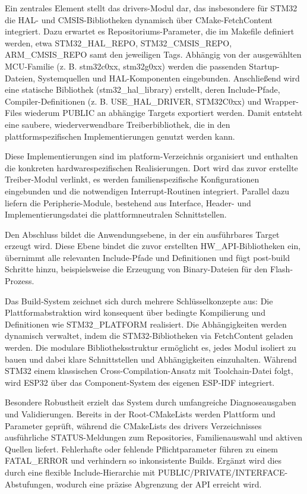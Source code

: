 Ein zentrales Element stellt das drivers-Modul dar, das insbesondere für STM32 die HAL- und CMSIS-Bibliotheken dynamisch über CMake-FetchContent integriert. 
Dazu erwartet es Repositoriums-Parameter, die im Makefile definiert werden, etwa STM32\_HAL\_REPO, STM32\_CMSIS\_REPO, ARM\_CMSIS\_REPO samt den jeweiligen Tags. 
Abhängig von der ausgewählten MCU-Familie (z. B. stm32c0xx, stm32g0xx) werden die passenden Startup-Dateien, Systemquellen und HAL-Komponenten eingebunden. 
Anschließend wird eine statische Bibliothek (stm32\_hal\_library) erstellt, deren Include-Pfade, Compiler-Definitionen (z. B. USE\_HAL\_DRIVER, STM32C0xx) und Wrapper-Files wiederum PUBLIC an abhängige Targets exportiert werden. 
Damit entsteht eine saubere, wiederverwendbare Treiberbibliothek, die in den plattformspezifischen Implementierungen genutzt werden kann.

Diese Implementierungen sind im platform-Verzeichnis organisiert und enthalten die konkreten hardwarespezifischen Realisierungen. 
Dort wird das zuvor erstellte Treiber-Modul verlinkt, es werden familienspezifische Konfigurationen eingebunden und die notwendigen Interrupt-Routinen integriert. 
Parallel dazu liefern die Peripherie-Module, bestehend aus Interface, Header- und Implementierungsdatei die plattformneutralen Schnittstellen.

Den Abschluss bildet die Anwendungsebene, in der ein ausführbares Target erzeugt wird. 
Diese Ebene bindet die zuvor erstellten HW\_API-Bibliotheken ein, übernimmt alle relevanten Include-Pfade und Definitionen und fügt post-build Schritte hinzu, beispielsweise die Erzeugung von Binary-Dateien für den Flash-Prozess.

Das Build-System zeichnet sich durch mehrere Schlüsselkonzepte aus: Die Plattformabstraktion wird konsequent über bedingte Kompilierung und Definitionen wie STM32\_PLATFORM realisiert.
Die Abhängigkeiten werden dynamisch verwaltet, indem die STM32-Bibliotheken via FetchContent geladen werden. 
Die modulare Bibliotheksstruktur ermöglicht es, jedes Modul isoliert zu bauen und dabei klare Schnittstellen und Abhängigkeiten einzuhalten. 
Während STM32 einem klassischen Cross-Compilation-Ansatz mit Toolchain-Datei folgt, wird ESP32 über das Component-System des eigenen ESP-IDF integriert.

Besondere Robustheit erzielt das System durch umfangreiche Diagnoseausgaben und Validierungen.
Bereits in der Root-CMakeLists werden Plattform und Parameter geprüft, während die CMakeLists des drivers Verzeichnisses ausführliche STATUS-Meldungen zum Repositories, Familienauswahl und aktiven Quellen liefert. 
Fehlerhafte oder fehlende Pflichtparameter führen zu einem FATAL\_ERROR und verhindern so inkonsistente Builds. 
Ergänzt wird dies durch eine flexible Include-Hierarchie mit PUBLIC/PRIVATE/INTERFACE-Abstufungen, wodurch eine präzise Abgrenzung der API erreicht wird.

